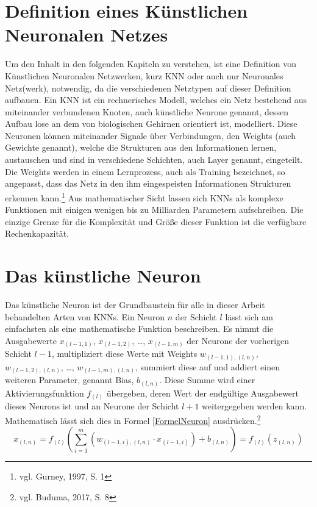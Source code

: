 \documentclass[
	a4paper,
	12pt,
	ngerman,
	oneside
]{scrreprt}											%
\begin{document}
		\section{Definition eines Künstlichen Neuronalen Netzes}\label{DefKNN}
			Um den Inhalt in den folgenden Kapiteln zu verstehen, ist eine Definition von Künstlichen Neuronalen Netzwerken, kurz KNN oder auch nur Neuronales Netz(werk), notwendig, da die verschiedenen Netztypen auf dieser Definition aufbauen. Ein KNN ist ein rechnerisches Modell, welches ein Netz bestehend aus miteinander verbundenen Knoten, auch künstliche Neurone genannt, dessen Aufbau lose an dem von biologischen Gehirnen orientiert ist, modelliert. Diese Neuronen können miteinander Signale über Verbindungen, den Weights (auch Gewichte genannt), welche die Strukturen aus den Informationen lernen, austauschen und sind in verschiedene Schichten, auch Layer genannt, eingeteilt. Die Weights werden in einem Lernprozess, auch als Training bezeichnet, so angepasst, dass das Netz in den ihm eingespeisten Informationen Strukturen erkennen kann.\footnote{vgl. Gurney, 1997, S. 1} Aus mathematischer Sicht lassen sich KNNs als komplexe Funktionen mit einigen wenigen bis zu Milliarden Parametern aufschreiben. Die einzige Grenze für die Komplexität und Größe dieser Funktion ist die verfügbare Rechenkapazität. 
			
		\section{Das künstliche Neuron}\label{DefKN}
			Das künstliche Neuron ist der Grundbaustein für alle in dieser Arbeit behandelten Arten von KNNs. Ein Neuron $n$ der Schicht $l$ lässt sich am einfachsten als eine mathematische Funktion beschreiben. Es nimmt die Ausgabewerte $x_{(l-1,1)}$, $x_{(l-1,2)}$, …, $x_{(l-1,m)}$ der Neurone der vorherigen Schicht $l-1$, multipliziert diese Werte mit Weights $w_{(l-1,1),(l,n)}$, $w_{(l-1,2),(l,n)}$, …, $w_{(l-1,m),(l,n)}$, summiert diese auf und addiert einen weiteren Parameter, genannt Bias, $b_{(l,n)}$. Diese Summe wird einer Aktivierungsfunktion $f_{(l)}$ übergeben, deren Wert der endgültige Ausgabewert dieses Neurons ist und an Neurone der Schicht $l+1$ weitergegeben werden kann. Mathematisch lässt sich dies in Formel \ref{FormelNeuron} ausdrücken.\footnote{vgl. Buduma, 2017, S. 8}
			\begin{equation}\label{FormelNeuron}
				x_{(l,n)} = f_{(l)} \left(\sum_{i=1}^{m}(w_{(l-1,i),(l,n)} \cdot x_{(l-1,i)}) + b_{(l,n)} \right) = f_{(l)}(z_{(l,n)})
			\end{equation}
\end{document}
